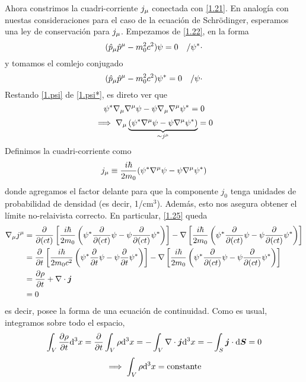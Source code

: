 Ahora constrimos la cuadri-corriente $j_\mu $ conectada con \eqref{1.21}. En analogía con nuestas consideraciones para el caso de la ecuación de Schrödinger, esperamos una ley de conservación para $j_\mu $. Empezamos de \eqref{1.22}, en la forma
\begin{equation}\label{1.psi*}
  (\hat{p}_\mu  \hat{p}^\mu -m_0^2c^2)\psi=0\quad /\psi^* \cdot
\end{equation}
y tomamos el comlejo conjugado
\begin{equation}\label{1.psi}
  (\hat{p}_\mu  \hat{p}^\mu -m_0^2c^2)\psi^*=0\quad /\psi\cdot
\end{equation}
Restando \eqref{1.psi} de \eqref{1.psi*}, es direto ver que
\begin{equation}
  \psi^*\nabla_\mu \nabla^\mu \psi-\psi\nabla_\mu \nabla^\mu \psi^*=0
\end{equation}\label{1.25}
\begin{equation}
  \implies \nabla_\mu \underbrace{(\psi^*\nabla^\mu \psi-\psi\nabla^\mu \psi^*)}_{\sim j^\mu }=0
\end{equation}
Definimos la cuadri-corriente como
\begin{equation}
  j_\mu \equiv\frac{i\hbar}{2m_0}(\psi^*\nabla^\mu \psi-\psi\nabla^\mu \psi^*)
\end{equation}
donde agregamos el factor delante para que la componente $j_0$ tenga unidades de probabilidad de densidad (es decir, 1/cm$^3$). Además, esto nos asegura obtener el límite no-relaivista correcto. En particular, \eqref{1.25} queda
\begin{align*}
  \nabla_\mu j^\mu &=\pdv{(ct)}\left[\frac{i\hbar}{2m_0}\left(\psi^*\pdv{(ct)}\psi-\psi\pdv{(ct)}\psi^*\right)\right]-\nabla\left[\frac{i\hbar}{2m_0}\left(\psi^*\pdv{(ct)}\psi-\psi\pdv{(ct)}\psi^*\right)\right]\\
  &=\pdv{t}\left[\frac{i\hbar}{2m_0c^2}\left(\psi^*\pdv{t}\psi-\psi\pdv{t}\psi^*\right)\right]-\nabla\left[\frac{i\hbar}{2m_0}\left(\psi^*\pdv{(ct)}\psi-\psi\pdv{(ct)}\psi^*\right)\right]\\
  &=\pdv{\rho}{t}+\nabla\cdot\vb*{j}\\
  &=0
\end{align*}
es decir, posee la forma de una ecuación de continuidad. Como es usual, integramos sobre todo el espacio,
\begin{equation}
  \int_V\pdv{\rho}{t}\dd^3x=\pdv{t}\int_V\rho\dd^3x=-\int_V\nabla\cdot\vb*{j}\dd^3x=-\int_{S}\vb*{j}\cdot \dd \vb*{S}=0
\end{equation}
\begin{equation}
  \implies \int_V\rho\dd^3x=\rm constante
\end{equation}\label{1.29}
